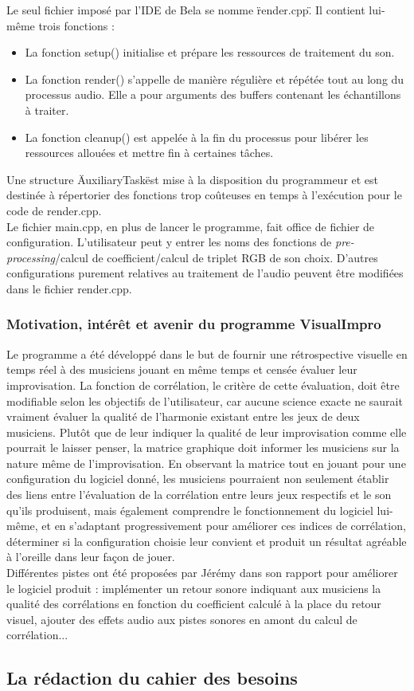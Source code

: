 Le seul fichier imposé par l'IDE de Bela se nomme \"render.cpp\". Il
contient lui-même trois fonctions :
\begin{itemize}
 \item La fonction setup() initialise et prépare les ressources de
       traitement du son.
 \item La fonction render() s'appelle de manière régulière et répétée
       tout au long du processus audio. Elle a pour arguments des buffers
       contenant les échantillons à traiter.
 \item La fonction cleanup() est appelée à la fin du processus pour
       libérer les ressources allouées et mettre fin à certaines tâches.
\end{itemize}

Une structure \"AuxiliaryTask\" est mise à la disposition du
programmeur et est destinée à répertorier des fonctions trop coûteuses
en temps à l'exécution pour le code de render.cpp. \\

Le fichier main.cpp, en plus de lancer le programme, fait office de
fichier de configuration. L'utilisateur peut y entrer les noms des
fonctions de \textit{pre-processing}/calcul de coefficient/calcul de
triplet RGB de son choix. D'autres configurations purement relatives
au traitement de l'audio peuvent être modifiées dans le fichier
render.cpp.

\subsubsection{Motivation, intérêt et avenir du programme VisualImpro}
Le programme a été développé dans le but de fournir une rétrospective
visuelle en temps réel à des musiciens jouant en même temps et censée
évaluer leur improvisation. La fonction de corrélation, le critère de
cette évaluation, doit être modifiable selon les objectifs de
l'utilisateur, car aucune science exacte ne saurait vraiment évaluer
la qualité de l'harmonie existant entre les jeux de deux
musiciens. Plutôt que de leur indiquer la qualité de leur
improvisation comme elle pourrait le laisser penser, la matrice
graphique doit informer les musiciens sur la nature même de
l'improvisation. En observant la matrice tout en jouant pour une
configuration du logiciel donné, les musiciens pourraient non
seulement établir des liens entre l'évaluation de la corrélation entre
leurs jeux respectifs et le son qu'ils produisent, mais également
comprendre le fonctionnement du logiciel lui-même, et en s'adaptant
progressivement pour améliorer ces indices de corrélation, déterminer
si la configuration choisie leur convient et produit un résultat
agréable à l'oreille dans leur façon de jouer. \\
Différentes pistes ont été proposées par Jérémy dans son rapport pour
améliorer le logiciel produit : implémenter un retour sonore indiquant
aux musiciens la qualité des corrélations en fonction du coefficient
calculé à la place du retour visuel, ajouter des effets audio aux
pistes sonores en amont du calcul de corrélation...

\subsection{La rédaction du cahier des besoins}
